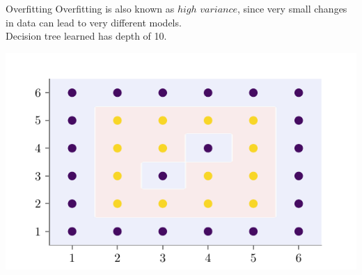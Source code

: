 \documentclass{beamer}
\begin{document}
\begin{frame}{Overfitting}
Overfitting is also known as $high$ $variance$, since very small changes in data can lead to very different models.\\
Decision tree learned has depth of 10.
\begin{center}
\includegraphics[scale=0.5]{../figures/decision-trees/bias-variance-full-depth.pdf}
\end{center}
\end{frame}
\end{document}
